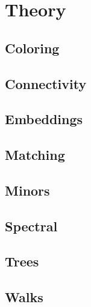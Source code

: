 \chapter{Theory}
\section{Coloring}

\section{Connectivity}

\section{Embeddings}

\section{Matching}

\section{Minors}

\section{Spectral}

\section{Trees}

\section{Walks}



